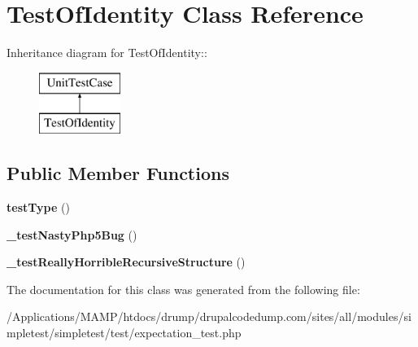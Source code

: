 \hypertarget{class_test_of_identity}{
\section{TestOfIdentity Class Reference}
\label{class_test_of_identity}
}
Inheritance diagram for TestOfIdentity::\begin{figure}[H]
\begin{center}
\leavevmode
\includegraphics[height=2cm]{class_test_of_identity}
\end{center}
\end{figure}
\subsection*{Public Member Functions}
\begin{DoxyCompactItemize}
\item 
\hypertarget{class_test_of_identity_a75b28aee76cbb333912a5c9fad2d7ea9}{
{\bfseries testType} ()}
\label{class_test_of_identity_a75b28aee76cbb333912a5c9fad2d7ea9}

\item 
\hypertarget{class_test_of_identity_a11dfd7295421ffefca9deafbadf48257}{
{\bfseries \_\-testNastyPhp5Bug} ()}
\label{class_test_of_identity_a11dfd7295421ffefca9deafbadf48257}

\item 
\hypertarget{class_test_of_identity_adc24b2ab0a0ec259c9eea22a8c2f56b1}{
{\bfseries \_\-testReallyHorribleRecursiveStructure} ()}
\label{class_test_of_identity_adc24b2ab0a0ec259c9eea22a8c2f56b1}

\end{DoxyCompactItemize}


The documentation for this class was generated from the following file:\begin{DoxyCompactItemize}
\item 
/Applications/MAMP/htdocs/drump/drupalcodedump.com/sites/all/modules/simpletest/simpletest/test/expectation\_\-test.php\end{DoxyCompactItemize}
